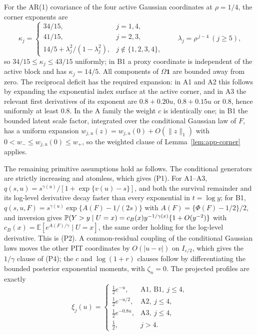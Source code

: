 \documentclass[bj,authoryear]{imsart}
\theoremstyle{plain}
\newcommand{\E}{\mathbb E}\newcommand{\R}{\mathbb R}
\begin{document}
\begin{appendix}
For the AR(1) covariance of the four active Gaussian coordinates at
$\rho=1/4$, the corner exponents are
\begin{equation}\label{eq:app-kappas}
 \kappa_j=
 \begin{cases}
  34/15, & j=1,4,\\
  41/15, & j=2,3,\\
  14/5+\lambda_j^2/(1-\lambda_j^2), & j\notin\{1,2,3,4\},
 \end{cases}
 \qquad \lambda_j=\rho^{\,j-4}\ (j\ge5),
\end{equation}
so $34/15\le\kappa_j\le43/15$ uniformly; in B1 a proxy coordinate is
independent of the active block and has $\kappa_j=14/5$. All components
of $\Omega\mathbf 1$ are bounded away from zero. The reciprocal deficit
has the required expansion: in A1 and A2 this follows by expanding the
exponential index surface at the active corner, and in A3 the relevant
first derivatives of its exponent are $0.8+0.20u$, $0.8+0.15u$ or $0.8$,
hence uniformly at least $0.8$. In the A family the weight $c$ is
identically one; in B1 the bounded latent scale factor, integrated over
the conditional Gaussian law of $F$, has a uniform expansion
$w_{j,u}(z)=w_{j,u}(0)+O(\|z\|_1)$ with $0<w_-\le w_{j,u}(0)\le w_+$, so
the weighted clause of Lemma~\ref{lem:app-corner} applies.

The remaining primitive assumptions hold as follows. The conditional
generators are strictly increasing and atomless, which gives (P1). For
A1--A3, $q(s,u)=s^{\gamma(u)}/[1+\exp\{v(u)-s\}]$, and both the survival
remainder and its log-level derivative decay faster than every
exponential in $t=\log y$; for B1,
$q(s,u,F)=s^{\gamma(u)}\exp\{A(F)-1/(2s)\}$ with
$A(F)=\{\Phi(F)-1/2\}/2$, and inversion gives
$\mathbb P(Y>y\mid U=x)=c_B(x)y^{-1/\gamma(x)}\{1+O(y^{-2})\}$ with
$c_B(x)=\E[e^{A(F)/\gamma}\mid U=x]$, the same order holding for the
log-level derivative. This is (P2). A common-residual coupling of the
conditional Gaussian laws moves the other PIT coordinates by
$O(|u-v|)$ on $I_{\varepsilon/2}$, which gives the $1/\gamma$ clause of
(P4); the $c$ and $\log(1+r)$ clauses follow by differentiating the
bounded posterior exponential moments, with $\zeta_n=0$. The projected
profiles are exactly
\[
 \xi_j(u)=
 \begin{cases}
  \tfrac12e^{-u}, & \text{A1, B1},\ j\le4,\\
  \tfrac12e^{-u/2}, & \text{A2},\ j\le4,\\
  \tfrac12e^{-0.8u}, & \text{A3},\ j\le4,\\
  \tfrac12, & j>4.
 \end{cases}
\]


\end{appendix}
\end{document}
